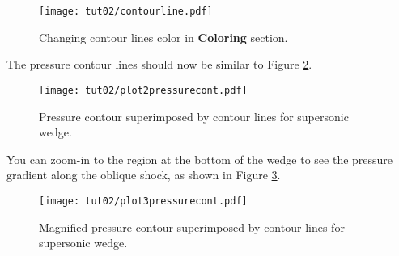 \begin{figure}[htbp]
    \centering
    \texttt{[image: tut02/contourline.pdf]}
    \caption{Changing contour lines color in \textbf{Coloring} section.}
    \label{fig2:colorby2}
\end{figure}
The pressure contour lines should now be similar to Figure \ref{fig2:pressure_contour_lines}.
\begin{figure}[htbp]
    \centering
    \texttt{[image: tut02/plot2pressurecont.pdf]}
    \caption{Pressure contour superimposed by contour lines for supersonic wedge.}
    \label{fig2:pressure_contour_lines}
\end{figure}
You can zoom-in to the region at the bottom of the wedge to see the pressure gradient along the oblique
shock, as shown in Figure \ref{fig2:pressure_contour_lines_zoom}.
\begin{figure}[htbp]
    \centering
    \texttt{[image: tut02/plot3pressurecont.pdf]}
    \caption{Magnified pressure contour superimposed by contour lines for supersonic wedge.}
    \label{fig2:pressure_contour_lines_zoom}
\end{figure}

